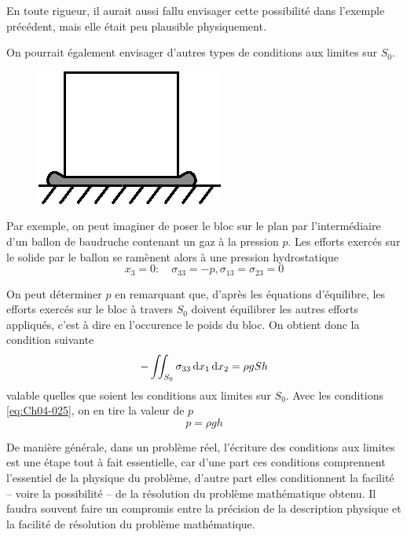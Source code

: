 En toute rigueur, il aurait aussi fallu envisager cette possibilité dans l'exemple précédent, mais elle était peu plausible physiquement.

On pourrait également envisager d'autres types de conditions aux limites sur $S_0$.
\begin{figure}
    \begin{center}
        \includegraphics{../images/T1_Ch04-0006}
    \end{center}
\end{figure}
Par exemple, on peut imaginer de poser le bloc sur le plan par l'intermédiaire d'un ballon de baudruche contenant un gaz à la pression $p$.
Les efforts exercés sur le solide par le ballon se ramènent alors à une pression hydrostatique
\begin{equation}
    x_3 = 0: \quad \sigma_{33} =-p, \sigma_{13} = \sigma_{23} = 0
    \label{eq:Ch04-025}
\end{equation}

On peut déterminer $p$ en remarquant que, d'après les équations d'équilibre, les efforts exercés sur le bloc à travers $S_0$ doivent équilibrer les autres efforts appliqués, c'est à dire en l'occurence le poids du bloc.
On obtient donc la condition suivante
\begin{equation}
    -\iint_{S_0} \sigma_{33} \mathop{\mathrm{{}d}}\mathopen{} x_1 \mathop{\mathrm{{}d}}\mathopen{} x_2 = \rho g S h
    \label{eq:Ch04-026}
\end{equation}
valable quelles que soient les conditions aux limites sur $S_0$.
Avec les conditions \eqref{eq:Ch04-025}, on en tire la valeur de $p$
\begin{equation}
    p = \rho g h
    \label{eq:Ch04-027}
\end{equation}

De manière générale, dans un problème réel, l'écriture des conditions aux limites est une étape tout à fait essentielle, car d'une part ces conditions comprennent l'essentiel de la physique du problème, d'autre part elles conditionnent la facilité -- voire la possibilité -- de la résolution du problème mathématique obtenu.
Il faudra souvent faire un compromis entre la précision de la description physique et la facilité de résolution du problème mathématique.

